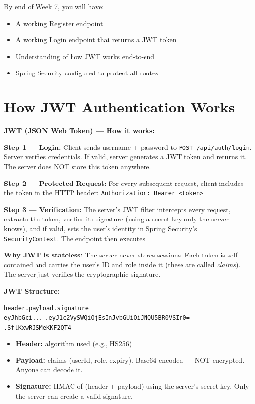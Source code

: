\documentclass[12pt,a4paper]{report}
\newcommand{\code}[1]{\texttt{\textcolor{keywordblue}{#1}}}
\newcommand{\apipath}[1]{\texttt{\textcolor{dangerred}{#1}}}
\begin{document}
By end of Week 7, you will have:
\begin{itemize}
  \item A working Register endpoint
  \item A working Login endpoint that returns a JWT token
  \item Understanding of how JWT works end-to-end
  \item Spring Security configured to protect all routes
\end{itemize}

\section{How JWT Authentication Works}

\begin{tcolorbox}[notebox]
\textbf{JWT (JSON Web Token) --- How it works:}

\textbf{Step 1 --- Login:} Client sends username + password to \apipath{POST /api/auth/login}. Server verifies credentials. If valid, server generates a JWT token and returns it. The server does NOT store this token anywhere.

\textbf{Step 2 --- Protected Request:} For every subsequent request, client includes the token in the HTTP header: \code{Authorization: Bearer <token>}

\textbf{Step 3 --- Verification:} The server's JWT filter intercepts every request, extracts the token, verifies its signature (using a secret key only the server knows), and if valid, sets the user's identity in Spring Security's \code{SecurityContext}. The endpoint then executes.

\textbf{Why JWT is stateless:} The server never stores sessions. Each token is self-contained and carries the user's ID and role inside it (these are called \textit{claims}). The server just verifies the cryptographic signature.

\textbf{JWT Structure:}
\begin{center}
\texttt{header.payload.signature}\\[4pt]
\texttt{eyJhbGci...} \texttt{.eyJ1c2VySWQiOjEsInJvbGUiOiJNQU5BR0VSIn0=} \texttt{.SflKxwRJSMeKKF2QT4}
\end{center}
\begin{itemize}
  \item \textbf{Header:} algorithm used (e.g., HS256)
  \item \textbf{Payload:} claims (userId, role, expiry). Base64 encoded --- NOT encrypted. Anyone can decode it.
  \item \textbf{Signature:} HMAC of (header + payload) using the server's secret key. Only the server can create a valid signature.
\end{itemize}
\end{tcolorbox}
\end{document}
